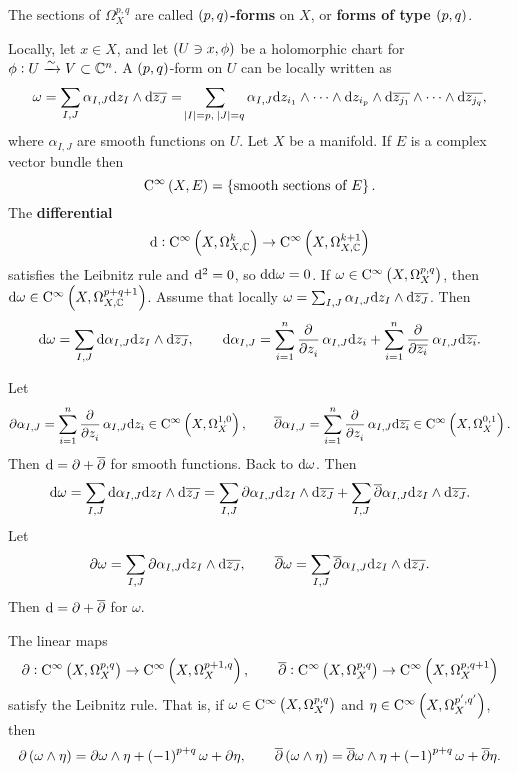 \begin{definition}
The sections of $ \Omega_X^{p, q} $ are called \textbf{$ \br{p, q} $-forms} on $ X $, or \textbf{forms of type $ \br{p, q} $}.
\end{definition}

Locally, let $ x \in X $, and let $ \br{U \ni x, \phi} $ be a holomorphic chart for $ \phi : U \xrightarrow{\sim} V \subset \mathbb{C}^n $. A $ \br{p, q} $-form on $ U $ can be locally written as
$$ \omega = \sum_{I, J} \alpha_{I, J} \d z_I \wedge \d\overline{z_J} = \sum_{\abs{I} = p, \ \abs{J} = q} \alpha_{I, J} \d z_{i_1} \wedge \dots \wedge \d z_{i_p} \wedge \d\overline{z_{j_1}} \wedge \dots \wedge \d\overline{z_{j_q}}, $$
where $ \alpha_{I, J} $ are smooth functions on $ U $. Let $ X $ be a manifold. If $ E $ is a complex vector bundle then
$$ \C^\infty\br{X, E} = \cbr{\text{smooth sections of} \ E}. $$
The \textbf{differential}
$$ \d : \C^\infty\br{X, \Omega_{X, \CC}^k} \to \C^\infty\br{X, \Omega_{X, \CC}^{k + 1}} $$
satisfies the Leibnitz rule and $ \mathrm{d}^2 = 0 $, so $ \mathrm{d}\mathrm{d}\omega = 0 $. If $ \omega \in \C^\infty\br{X, \Omega_X^{p, q}} $, then $ \d\omega \in \C^\infty\br{X, \Omega_{X, \CC}^{p + q + 1}} $. Assume that locally $ \omega = \sum_{I, J} \alpha_{I, J} \mathrm{d} z_I \wedge \mathrm{d}\overline{z_J} $. Then
$$ \d\omega = \sum_{I, J} \d\alpha_{I, J} \d z_I \wedge \d\overline{z_J}, \qquad \d\alpha_{I, J} = \sum_{i = 1}^n \dpd{}{z_i}\alpha_{I, J} \d z_i + \sum_{i = 1}^n \dpd{}{\overline{z_i}}\alpha_{I, J} \d\overline{z_i}. $$

\pagebreak

Let
$$ \partial\alpha_{I, J} = \sum_{i = 1}^n \dpd{}{z_i}\alpha_{I, J} \d z_i \in \C^\infty\br{X, \Omega_X^{1, 0}}, \qquad \overline{\partial}\alpha_{I, J} = \sum_{i = 1}^n \dpd{}{z_i}\alpha_{I, J} \d\overline{z_i} \in \C^\infty\br{X, \Omega_X^{0, 1}}. $$
Then $ \mathrm{d} = \partial + \overline{\partial} $ for smooth functions. Back to $ \mathrm{d}\omega $. Then
$$ \mathrm{d}\omega = \sum_{I, J} \mathrm{d}\alpha_{I, J} \mathrm{d} z_I \wedge \mathrm{d}\overline{z_J} = \sum_{I, J} \partial\alpha_{I, J} \mathrm{d} z_I \wedge \mathrm{d}\overline{z_J} + \sum_{I, J} \overline{\partial}\alpha_{I, J} \mathrm{d} z_I \wedge \mathrm{d}\overline{z_J}. $$
Let
$$ \partial\omega = \sum_{I, J} \partial\alpha_{I, J} \mathrm{d} z_I \wedge \mathrm{d}\overline{z_J}, \qquad \overline{\partial}\omega = \sum_{I, J} \overline{\partial}\alpha_{I, J} \mathrm{d} z_I \wedge \mathrm{d}\overline{z_J}. $$
Then $ \mathrm{d} = \partial + \overline{\partial} $ for $ \omega $.

\begin{lemma}
The linear maps
$$ \partial : \C^\infty\br{X, \Omega_X^{p, q}} \to \C^\infty\br{X, \Omega_X^{p + 1, q}}, \qquad \overline{\partial} : \C^\infty\br{X, \Omega_X^{p, q}} \to \C^\infty\br{X, \Omega_X^{p, q + 1}} $$
satisfy the Leibnitz rule. That is, if $ \omega \in \C^\infty\br{X, \Omega_X^{p, q}} $ and $ \eta \in \C^\infty\br{X, \Omega_X^{p', q'}} $, then
$$ \partial\br{\omega \wedge \eta} = \partial\omega \wedge \eta + \br{-1}^{p + q}\omega + \partial\eta, \qquad \overline{\partial}\br{\omega \wedge \eta} = \overline{\partial}\omega \wedge \eta + \br{-1}^{p + q}\omega + \overline{\partial}\eta. $$
\end{lemma}

